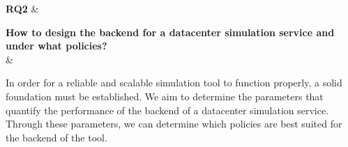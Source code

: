 \textbf{RQ2} \label{question:rq2} &

\textbf{How to design the backend for a datacenter simulation service and under what policies?}
\\&

In order for a reliable and scalable simulation tool to function properly, a solid foundation must be established.
We aim to determine the parameters that quantify the performance of the backend of a datacenter simulation service.
Through these parameters, we can determine which policies are best suited for the backend of the tool.
\\\\